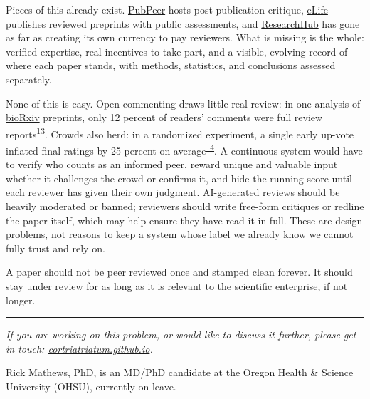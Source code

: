 \documentclass[12pt]{article}
\begin{document}
Pieces of this already exist. \href{https://pubpeer.com/}{PubPeer} hosts post-publication critique, \href{https://elifesciences.org/about/peer-review}{eLife} publishes reviewed preprints with public assessments, and \href{https://www.researchhub.com/}{ResearchHub} has gone as far as creating its own currency to pay reviewers. What is missing is the whole: verified expertise, real incentives to take part, and a visible, evolving record of where each paper stands, with methods, statistics, and conclusions assessed separately.

None of this is easy. Open commenting draws little real review: in one analysis of \href{https://www.biorxiv.org/}{bioRxiv} preprints, only 12 percent of readers' comments were full review reports\textsuperscript{\hyperlink{ref-malicki2021}{13}}. Crowds also herd: in a randomized experiment, a single early up-vote inflated final ratings by 25 percent on average\textsuperscript{\hyperlink{ref-muchnik2013}{14}}. A continuous system would have to verify who counts as an informed peer, reward unique and valuable input whether it challenges the crowd or confirms it, and hide the running score until each reviewer has given their own judgment. AI-generated reviews should be heavily moderated or banned; reviewers should write free-form critiques or redline the paper itself, which may help ensure they have read it in full. These are design problems, not reasons to keep a system whose label we already know we cannot fully trust and rely on.

A paper should not be peer reviewed once and stamped clean forever. It should stay under review for as long as it is relevant to the scientific enterprise, if not longer.

\vspace{14pt}
{\color{rule}\noindent\rule{0.3\textwidth}{0.4pt}}
\vspace{4pt}

{\fontsize{11.7}{16.38}\selectfont\setlength{\parindent}{0pt}\setlength{\parskip}{5pt}
{\itshape If you are working on this problem, or would like to discuss it further, please get in touch: \href{https://cortriatriatum.github.io/\#contact}{\upshape cortriatriatum.github.io}.}

Rick Mathews, PhD, is an MD/PhD candidate at the Oregon Health \& Science University (OHSU), currently on leave.

}
\end{document}
